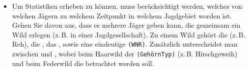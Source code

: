 \documentclass{lehramt-informatik-minimal}
\begin{document}
\begin{itemize}
\item Um Statistiken erheben zu können, muss berücksichtigt werden,
welches  von welchen Jägern zu welchem Zeitpunkt in
welchem Jagdgebiet  worden ist. Gehen Sie davon
aus, dass es mehrere Jäger geben kann, die gemeinsam ein Wild erlegen
(z.\,B. in einer Jagdgesellschaft). Zu einem Wild gehört die
 (z.\,B. Reh), die , das
, sowie eine eindeutige
 \texttt{(WNR)}. Zusätzlich
unterscheidet man zwischen  und ,
wobei beim Haarwild der 
\texttt{(GehörnTyp)} (z.\,B. Hirschgeweih) und beim Federwild die
 betrachtet werden soll.
\end{itemize}
\end{document}
